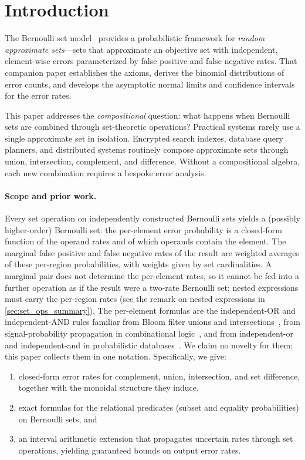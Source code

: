 
\section{Introduction}

The Bernoulli set model~\cite{bernoulliSets} provides a probabilistic framework for \emph{random approximate sets}---sets that approximate an objective set with independent, element-wise errors parameterized by false positive and false negative rates.
That companion paper establishes the axioms, derives the binomial distributions of error counts, and develops the asymptotic normal limits and confidence intervals for the error rates.

This paper addresses the \emph{compositional} question: what happens when Bernoulli sets are combined through set-theoretic operations?
Practical systems rarely use a single approximate set in isolation.
Encrypted search indexes, database query planners, and distributed systems routinely compose approximate sets through union, intersection, complement, and difference.
Without a compositional algebra, each new combination requires a bespoke error analysis.

\paragraph{Scope and prior work.}
Every set operation on independently constructed Bernoulli sets yields a (possibly higher-order) Bernoulli set: the per-element error probability is a closed-form function of the operand rates and of which operands contain the element.
The marginal false positive and false negative rates of the result are weighted averages of these per-region probabilities, with weights given by set cardinalities.
A marginal pair does not determine the per-element rates, so it cannot be fed into a further operation as if the result were a two-rate Bernoulli set; nested expressions must carry the per-region rates (see the remark on nested expressions in \cref{sec:set_ops_summary}).
The per-element formulas are the independent-OR and independent-AND rules familiar from Bloom filter unions and intersections~\cite{bloom1970,broderMitzenmacher2004,papapetrou2010}, from signal-probability propagation in combinational logic~\cite{parker1975,krishnaswamy2008ptm}, and from independent-or and independent-and in probabilistic databases~\cite{dalvi2007}.
We claim no novelty for them; this paper collects them in one notation.
Specifically, we give:
\begin{enumerate}[nosep]
    \item closed-form error rates for complement, union, intersection, and set difference, together with the monoidal structure they induce,
    \item exact formulas for the relational predicates (subset and equality probabilities) on Bernoulli sets, and
    \item an interval arithmetic extension that propagates uncertain rates through set operations, yielding guaranteed bounds on output error rates.
\end{enumerate}

